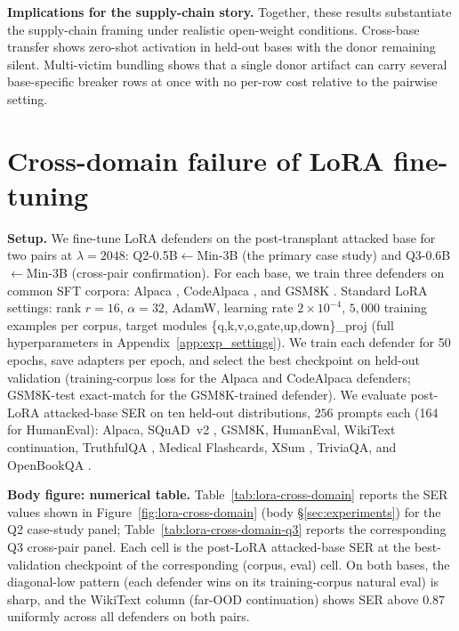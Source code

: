 \documentclass{article}
\theoremstyle{plain}
\theoremstyle{definition}
\theoremstyle{remark}
\begin{document}
\noindent\textbf{Implications for the supply-chain story.}
Together, these results substantiate the supply-chain framing under realistic open-weight conditions. Cross-base transfer shows zero-shot activation in held-out bases with the donor remaining silent. Multi-victim bundling shows that a single donor artifact can carry several base-specific breaker rows at once with no per-row cost relative to the pairwise setting.

\section{Cross-domain failure of LoRA fine-tuning}
\label{app:lora_persistence}

\noindent\textbf{Setup.}
We fine-tune LoRA defenders on the post-transplant attacked base for two pairs at $\lambda{=}2048$: Q2-0.5B$\leftarrow$Min-3B (the primary case study) and Q3-0.6B$\leftarrow$Min-3B (cross-pair confirmation). For each base, we train three defenders on common SFT corpora: Alpaca \citep{taori2023alpaca}, CodeAlpaca \citep{codealpaca}, and GSM8K \citep{cobbe2021gsm8k}. Standard LoRA settings: rank $r{=}16$, $\alpha{=}32$, AdamW, learning rate $2\times10^{-4}$, $5{,}000$ training examples per corpus, target modules \{q,k,v,o,gate,up,down\}\_proj (full hyperparameters in Appendix~\ref{app:exp_settings}). We train each defender for 50 epochs, save adapters per epoch, and select the best checkpoint on held-out validation (training-corpus loss for the Alpaca and CodeAlpaca defenders; GSM8K-test exact-match for the GSM8K-trained defender). We evaluate post-LoRA attacked-base SER on ten held-out distributions, $256$ prompts each (164 for HumanEval): Alpaca, SQuAD~v2 \citep{rajpurkar2018squad}, GSM8K, HumanEval, WikiText \citep{merity2016wikitext} continuation, TruthfulQA \citep{lin2022truthfulqa}, Medical Flashcards, XSum \citep{narayan2018xsum}, TriviaQA, and OpenBookQA \citep{mihaylov2018openbookqa}.

\noindent\textbf{Body figure: numerical table.}
Table~\ref{tab:lora-cross-domain} reports the SER values shown in Figure~\ref{fig:lora-cross-domain} (body \S\ref{sec:experiments}) for the Q2 case-study panel; Table~\ref{tab:lora-cross-domain-q3} reports the corresponding Q3 cross-pair panel. Each cell is the post-LoRA attacked-base SER at the best-validation checkpoint of the corresponding (corpus, eval) cell. On both bases, the diagonal-low pattern (each defender wins on its training-corpus natural eval) is sharp, and the WikiText column (far-OOD continuation) shows SER above $0.87$ uniformly across all defenders on both pairs.
\end{document}

